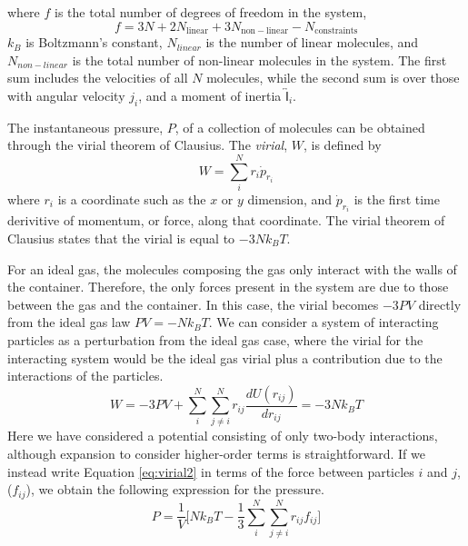 where $f$ is the total number of degrees of freedom in the system,
\begin{equation}
f = 3 N + 2 N_{\mathrm{linear}} + 3 N_{\mathrm{non-linear}} - N_{\mathrm{constraints}}
\end{equation}
$k_B$ is Boltzmann's constant, $N_{linear}$ is the number of linear
molecules, and $N_{non-linear}$ is the total number of non-linear
molecules in the system. The first sum includes the velocities of all
$N$ molecules, while the second sum is over those with angular
velocity $j_i$, and a moment of inertia
$\overleftrightarrow{\mathsf{I}}_i$.

The instantaneous pressure, $P$, of a collection of molecules can be
obtained through the virial theorem of Clausius. The \textit{virial},
$W$, is defined by
\begin{equation}\label{eq:virial}
W = \sum_i^N r_i\dot{p}_{r_i}
\end{equation}
where $r_i$ is a coordinate such as the $x$ or $y$ dimension, and
$\dot{p}_{r_i}$ is the first time derivitive of momentum, or force,
along that coordinate. The virial theorem of Clausius states that the
virial is equal to $-3Nk_BT$.

For an ideal gas, the molecules composing the gas only interact with
the walls of the container. Therefore, the only forces present in the
system are due to those between the gas and the container. In this
case, the virial becomes $-3PV$ directly from the ideal gas law
$PV=-Nk_BT$. We can consider a system of interacting particles as a
perturbation from the ideal gas case, where the virial for the
interacting system would be the ideal gas virial plus a contribution
due to the interactions of the particles. 
\begin{equation}\label{eq:virial2}
W = -3PV + \sum_i^N \sum_{j\neq i}^N r_{ij} \frac{dU(r_{ij})}{dr_{ij}} = -3Nk_BT
\end{equation}
Here we have considered a potential consisting of only two-body
interactions, although expansion to consider higher-order terms is
straightforward. If we instead write Equation \eqref{eq:virial2} in terms
of the force between particles $i$ and $j$, ($f_{ij}$), we obtain the
following expression for the pressure.
\begin{equation}\label{eq:virial3}
P = \frac{1}{V}\Big[Nk_BT - \frac{1}{3} \sum_i^N \sum_{j\neq i}^N
r_{ij} f_{ij}\Big]
\end{equation}

